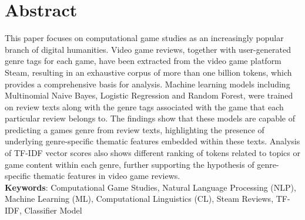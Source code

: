 \documentclass[11pt, a4paper]{article}
\begin{document}
\thispagestyle{empty}\clearpage

\section*{Abstract}
This paper focuses on computational game studies as an increasingly popular branch of digital humanities.
Video game reviews, together with user-generated genre tags for each game, have been extracted from the video game
platform Steam, resulting in an exhaustive corpus of more than one billion tokens, which provides a comprehensive
basis for analysis.
Machine learning models including Multinomial Naive Bayes, Logistic Regression and Random Forest, were trained on review texts
along with the genre tags associated with the game that each particular review belongs to.
The findings show that these models are capable of predicting a games genre from review texts, highlighting the
presence of underlying genre-specific thematic features embedded within these texts.
Analysis of TF-IDF vector scores also shows different ranking of tokens related to topics or game content within each
genre, further supporting the hypothesis of genre-specific thematic features in video game reviews.\\

\noindent\textbf{Keywords}: Computational Game Studies, Natural Language Processing (NLP), Machine Learning (ML),
Computational Linguistics (CL), Steam Reviews, TF-IDF, Classifier Model
\clearpage


\clearpage
\tableofcontents\vspace{2\baselineskip}%
\listoftables\vspace{2\baselineskip}%
\listoffigures\clearpage
\end{document}
